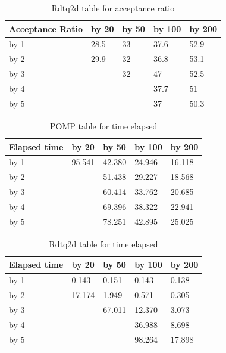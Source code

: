 \documentclass[a4paper,11pt]{article}
\begin{document}
\begin{table}[h]
\centering
\caption{Rdtq2d table for acceptance ratio}
\begin{tabular}{|l|l|l|l|l|}
\hline
Acceptance Ratio & by 20 & by 50 & by 100 & by 200 \\ \hline
by 1             & 28.5  & 33    & 37.6   & 52.9   \\ \hline
by 2             & 29.9  & 32    & 36.8   & 53.1   \\ \hline
by 3             &       & 32    & 47     & 52.5   \\ \hline
by 4             &       &       & 37.7   & 51     \\ \hline
by 5             &       &       & 37     & 50.3   \\ \hline
\end{tabular}
\end{table}

\begin{table}[h]
\centering
\caption{POMP table for time elapsed}
\begin{tabular}{|l|l|l|l|l|}
\hline
Elapsed time & by 20  & by 50  & by 100 & by 200 \\ \hline
by 1         & 95.541 & 42.380 & 24.946 & 16.118 \\ \hline
by 2         &        & 51.438 & 29.227 & 18.568 \\ \hline
by 3         &        & 60.414 & 33.762 & 20.685 \\ \hline
by 4         &        & 69.396 & 38.322 & 22.941 \\ \hline
by 5         &        & 78.251 & 42.895 & 25.025 \\ \hline
\end{tabular}
\end{table}

\begin{table}[h]
\centering
\caption{Rdtq2d table for time elapsed}
\begin{tabular}{|l|l|l|l|l|}
\hline
Elapsed time & by 20  & by 50  & by 100 & by 200 \\ \hline
by 1         & 0.143  & 0.151  & 0.143  & 0.138  \\ \hline
by 2         & 17.174 & 1.949  & 0.571  & 0.305  \\ \hline
by 3         &        & 67.011 & 12.370 & 3.073  \\ \hline
by 4         &        &        & 36.988 & 8.698  \\ \hline
by 5         &        &        & 98.264 & 17.898 \\ \hline
\end{tabular}
\end{table}
\end{document}
